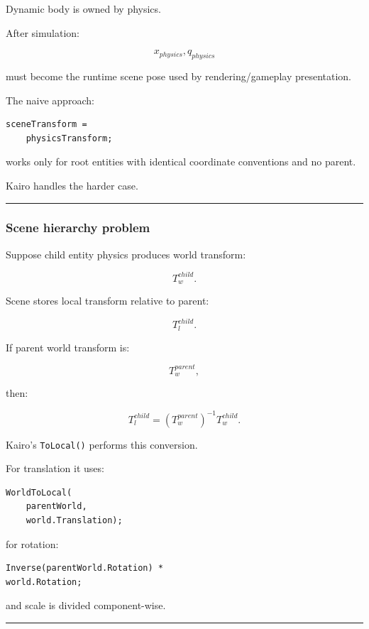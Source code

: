 Dynamic body is owned by physics.

After simulation:

\[
x_{physics},q_{physics}
\]

must become the runtime scene pose used by rendering/gameplay presentation.

The naive approach:

\begin{verbatim}
sceneTransform =
    physicsTransform;
\end{verbatim}

works only for root entities with identical coordinate conventions and no parent.

Kairo handles the harder case.

\begin{center}\rule{0.5\linewidth}{0.5pt}\end{center}

\subsubsection{Scene hierarchy problem}\label{scene-hierarchy-problem}

Suppose child entity physics produces world transform:

\[
T_w^{child}.
\]

Scene stores local transform relative to parent:

\[
T_l^{child}.
\]

If parent world transform is:

\[
T_w^{parent},
\]

then:

\[
\boxed{
T_l^{child}
=
(T_w^{parent})^{-1}
T_w^{child}.
}
\]

Kairo's \texttt{ToLocal()} performs this conversion.

For translation it uses:

\begin{verbatim}
WorldToLocal(
    parentWorld,
    world.Translation);
\end{verbatim}

for rotation:

\begin{verbatim}
Inverse(parentWorld.Rotation) *
world.Rotation;
\end{verbatim}

and scale is divided component-wise.

\begin{center}\rule{0.5\linewidth}{0.5pt}\end{center}

